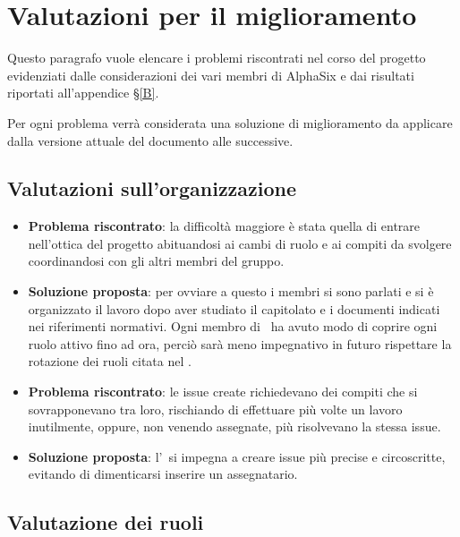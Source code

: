 \newpage
\section{Valutazioni per il miglioramento}	\label{D}
	
	Questo paragrafo vuole elencare i problemi riscontrati nel corso del progetto evidenziati dalle considerazioni dei vari membri di AlphaSix e dai risultati riportati all'appendice \S\ref{B}.
	
	Per ogni problema verrà considerata una soluzione di miglioramento da applicare dalla versione attuale del documento alle successive.

	\subsection{Valutazioni sull'organizzazione}
		\begin{itemize}
			\item \textbf{Problema riscontrato}: la difficoltà maggiore è stata quella di entrare nell'ottica del progetto abituandosi ai cambi di ruolo e ai compiti da svolgere coordinandosi con gli altri membri del gruppo.
			\item \textbf{Soluzione proposta}: per ovviare a questo i membri si sono parlati e si è organizzato il lavoro dopo aver studiato il capitolato e i documenti indicati nei riferimenti normativi. Ogni membro di \gruppo\ ha avuto modo di coprire ogni ruolo attivo fino ad ora, perciò sarà meno impegnativo in futuro rispettare la rotazione dei ruoli citata nel \PdPd.
			\item \textbf{Problema riscontrato}: le issue create richiedevano dei compiti che si sovrapponevano tra loro, rischiando di effettuare più volte un lavoro inutilmente, oppure, non venendo assegnate, più  risolvevano la stessa issue.
			\item \textbf{Soluzione proposta}: l'\Amm\ si impegna a creare issue più precise e circoscritte, evitando di dimenticarsi inserire un assegnatario.
		\end{itemize}
	
	
	\subsection{Valutazione dei ruoli}
	
